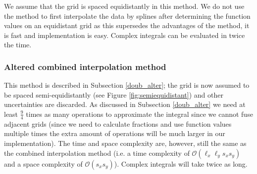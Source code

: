We assume that the grid is spaced equidistantly in this method.
We do not use the method to first interpolate the data by splines after determining the function values on an equidistant grid as this supersedes the advantages of the method, it is fast and implementation is easy.
Complex integrals can be evaluated in twice the time.

\subsubsection{Altered combined interpolation method}
This method is described in Subsection \ref{doub_alter}; the grid is now assumed to be spaced semi-equidistantly (see Figure \ref{fig:semiequidistant}) and other uncertainties are discarded.
As discussed in Subsection \ref{doub_alter} we need at least $\frac{9}{4}$ times as many operations to approximate the integral since we cannot fuse adjacent grids (since we need to calculate fractions and use function values multiple times the extra amount of operations will be much larger in our implementation).
The time and space complexity are, however, still the same as the combined interpolation method (i.e. a time complexity of $\mathcal O(\ell_x\ell_y s_x s_y)$ and a space complexity of $\mathcal O(s_x s_y)$).
Complex integrals will take twice as long.
